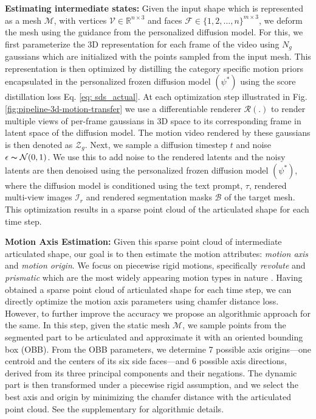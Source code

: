 \noindent\textbf{Estimating intermediate states:} Given the input shape which is represented as a mesh $\mathcal{M}$, with vertices $\mathcal{V} \in \mathbb{R}^{n\times3}$ and faces $\mathcal{F} \in \{1, 2, \dots, n\}^{m\times3}$, we deform the mesh using the guidance from the personalized diffusion model. For this, we first parameterize the 3D representation for each frame of the video using $N_{g}$ gaussians which are initialized with the points sampled from the input mesh. This representation is then optimized by distilling the category specific motion priors encapsulated in the personalized frozen diffusion model $(\psi^{*})$ using the score distillation loss Eq. \ref{eq: sds_actual}. At each optimization step illustrated in Fig. \ref{fig:pipeline-3d-motion-transfer} we use a differentiable renderer $\mathcal{R(.)}$ \cite{keselman2022approximate, keselman2023flexible} to render multiple views of per-frame gaussians in 3D space to its corresponding frame in latent space of the diffusion model. The motion video rendered by these gaussians is then denoted as $\mathcal{Z}_{g}$. Next, we sample a diffusion timestep $t$ and noise $\epsilon \thicksim \mathcal{N}(0,1)$. We use this to add noise to the rendered latents and the noisy latents are then denoised using the personalized frozen diffusion model $(\psi^{*})$, where the diffusion model is conditioned using the text prompt, $\tau$, rendered multi-view images $\mathcal{I}_{r}$ and rendered segmentation masks $\mathcal{B}$ of the target mesh. This optimization results in a sparse point cloud of the articulated shape for each time step. 

\noindent\textbf{Motion Axis Estimation:} Given this sparse point cloud of intermediate articulated shape, our goal is to then estimate the motion attributes: \textit{motion axis} and \textit{motion origin}. We focus on piecewise rigid motions, specifically \textit{revolute} and \textit{prismatic} which are the most widely appearing motion types in nature \cite{liu2023paris, qiu2025articulate}. Having obtained a sparse point cloud of articulated shape for each time step, we can directly optimize the motion axis parameters using chamfer distance loss. However, to further improve the accuracy we propose an algorithmic approach for the same. In this step, given the static mesh $\mathcal{M}$, we sample points from the segmented part to be articulated and approximate it with an oriented bounding box (OBB). From the OBB parameters, we determine 7 possible axis origins—one centroid and the centers of its six side faces—and 6 possible axis directions, derived from its three principal components and their negations. The dynamic part is then transformed under a piecewise rigid assumption, and we select the best axis and origin by minimizing the chamfer distance with the articulated point cloud. See the supplementary for algorithmic details.


